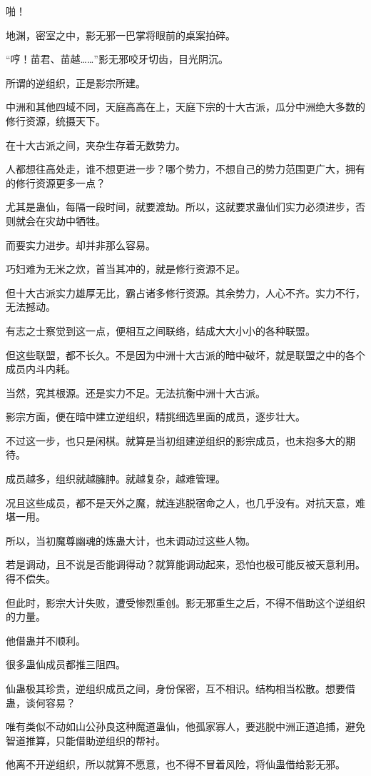 \begin{this_body}
啪！

地渊，密室之中，影无邪一巴掌将眼前的桌案拍碎。

“哼！苗君、苗越……”影无邪咬牙切齿，目光阴沉。

所谓的逆组织，正是影宗所建。

中洲和其他四域不同，天庭高高在上，天庭下宗的十大古派，瓜分中洲绝大多数的修行资源，统摄天下。

在十大古派之间，夹杂生存着无数势力。

人都想往高处走，谁不想更进一步？哪个势力，不想自己的势力范围更广大，拥有的修行资源更多一点？

尤其是蛊仙，每隔一段时间，就要渡劫。所以，这就要求蛊仙们实力必须进步，否则就会在灾劫中牺牲。

而要实力进步。却并非那么容易。

巧妇难为无米之炊，首当其冲的，就是修行资源不足。

但十大古派实力雄厚无比，霸占诸多修行资源。其余势力，人心不齐。实力不行，无法撼动。

有志之士察觉到这一点，便相互之间联络，结成大大小小的各种联盟。

但这些联盟，都不长久。不是因为中洲十大古派的暗中破坏，就是联盟之中的各个成员内斗内耗。

当然，究其根源。还是实力不足。无法抗衡中洲十大古派。

影宗方面，便在暗中建立逆组织，精挑细选里面的成员，逐步壮大。

不过这一步，也只是闲棋。就算是当初组建逆组织的影宗成员，也未抱多大的期待。

成员越多，组织就越臃肿。就越复杂，越难管理。

况且这些成员，都不是天外之魔，就连逃脱宿命之人，也几乎没有。对抗天意，难堪一用。

所以，当初魔尊幽魂的炼蛊大计，也未调动过这些人物。

若是调动，且不说是否能调得动？就算能调动起来，恐怕也极可能反被天意利用。得不偿失。

但此时，影宗大计失败，遭受惨烈重创。影无邪重生之后，不得不借助这个逆组织的力量。

他借蛊并不顺利。

很多蛊仙成员都推三阻四。

仙蛊极其珍贵，逆组织成员之间，身份保密，互不相识。结构相当松散。想要借蛊，谈何容易？

唯有类似不动如山公孙良这种魔道蛊仙，他孤家寡人，要逃脱中洲正道追捕，避免智道推算，只能借助逆组织的帮衬。

他离不开逆组织，所以就算不愿意，也不得不冒着风险，将仙蛊借给影无邪。


\end{this_body}
